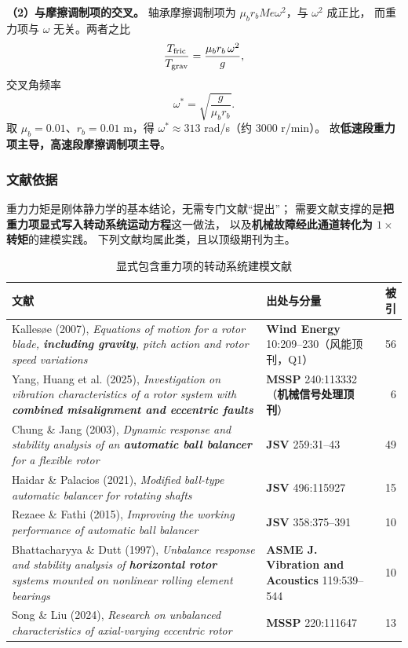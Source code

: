 \documentclass[11pt,a4paper]{ctexart}
\begin{document}
\textbf{（2）与摩擦调制项的交叉。} 轴承摩擦调制项为 $\mu_b r_bMe\omega^2$，与 $\omega^2$ 成正比，
而重力项与 $\omega$ 无关。两者之比
\begin{equation}
\frac{T_{\rm fric}}{T_{\rm grav}}=\frac{\mu_b r_b\,\omega^2}{g},
\end{equation}
交叉角频率
\begin{equation}
\omega^{*}=\sqrt{\frac{g}{\mu_b r_b}} .
\end{equation}
取 $\mu_b=0.01$、$r_b=0.01$ m，得 $\omega^{*}\approx313$ rad/s（约 3000 r/min）。
故\textbf{低速段重力项主导，高速段摩擦调制项主导}。

\subsubsection{文献依据}

重力力矩是刚体静力学的基本结论，无需专门文献“提出”；
需要文献支撑的是\textbf{把重力项显式写入转动系统运动方程}这一做法，
以及\textbf{机械故障经此通道转化为 $1\times$ 转矩}的建模实践。
下列文献均属此类，且以顶级期刊为主。

\begin{table}[h]
\centering
\caption{显式包含重力项的转动系统建模文献}
\small
\begin{tabular}{@{}p{7.3cm}p{3.2cm}r@{}}
\toprule
文献 & 出处与分量 & 被引 \\
\midrule
Kallesøe (2007), \emph{Equations of motion for a rotor blade, \textbf{including gravity}, pitch action and rotor speed variations}
& \textbf{Wind Energy} 10:209--230（风能顶刊，Q1） & 56 \\
Yang, Huang et al. (2025), \emph{Investigation on vibration characteristics of a rotor system with \textbf{combined misalignment and eccentric faults}}
& \textbf{MSSP} 240:113332（\textbf{机械信号处理顶刊}） & 6 \\
Chung \& Jang (2003), \emph{Dynamic response and stability analysis of an \textbf{automatic ball balancer} for a flexible rotor}
& \textbf{JSV} 259:31--43 & 49 \\
Haidar \& Palacios (2021), \emph{Modified ball-type automatic balancer for rotating shafts}
& \textbf{JSV} 496:115927 & 15 \\
Rezaee \& Fathi (2015), \emph{Improving the working performance of automatic ball balancer}
& \textbf{JSV} 358:375--391 & 10 \\
Bhattacharyya \& Dutt (1997), \emph{Unbalance response and stability analysis of \textbf{horizontal rotor} systems mounted on nonlinear rolling element bearings}
& \textbf{ASME J. Vibration and Acoustics} 119:539--544 & 10 \\
Song \& Liu (2024), \emph{Research on unbalanced characteristics of axial-varying eccentric rotor}
& \textbf{MSSP} 220:111647 & 13 \\
\bottomrule
\end{tabular}
\end{table}
\end{document}
